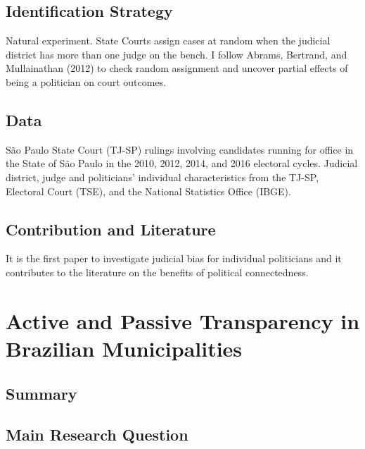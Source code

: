 \documentclass[]{article}
\begin{document}
\hypertarget{identification-strategy-1}{%
\subsection{Identification Strategy}\label{identification-strategy-1}}

Natural experiment. State Courts assign cases at random when the
judicial district has more than one judge on the bench. I follow Abrams,
Bertrand, and Mullainathan (2012) to check random assignment and uncover
partial effects of being a politician on court outcomes.

\hypertarget{data-1}{%
\subsection{Data}\label{data-1}}

São Paulo State Court (TJ-SP) rulings involving candidates running for
office in the State of São Paulo in the 2010, 2012, 2014, and 2016
electoral cycles. Judicial district, judge and politicians' individual
characteristics from the TJ-SP, Electoral Court (TSE), and the National
Statistics Office (IBGE).

\hypertarget{contribution-and-literature-1}{%
\subsection{Contribution and
Literature}\label{contribution-and-literature-1}}

It is the first paper to investigate judicial bias for individual
politicians and it contributes to the literature on the benefits of
political connectedness.

\hypertarget{title3}{%
\section{Active and Passive Transparency in Brazilian
Municipalities}\label{title3}}

\hypertarget{summary-2}{%
\subsection{Summary}\label{summary-2}}

\hypertarget{main-research-question-2}{%
\subsection{Main Research Question}\label{main-research-question-2}}
\end{document}
